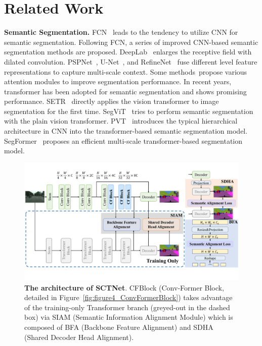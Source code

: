 \documentclass[letterpaper]{article} %
\begin{document}
\section{Related Work}
\textbf{Semantic Segmentation.} 
FCN~\cite{long2015fully} leads to the tendency to utilize CNN for semantic segmentation. Following FCN, a series of improved CNN-based semantic segmentation methods are proposed. DeepLab~\cite{chen2017deeplab} enlarges the receptive field with dilated convolution. PSPNet~\cite{zhao2017pyramid}, U-Net~\cite{ronneberger2015u}, and RefineNet~\cite{lin2017refinenet} fuse different level feature representations to capture multi-scale context. Some methods~\cite{fu2019dual,huang2019ccnet,yuan2018ocnet,zhao2018psanet}propose various attention modules to improve segmentation performance. In recent years, transformer has been adopted for semantic segmentation and shows promising performance. SETR~\cite{zheng2021rethinking} directly applies the vision transformer to image segmentation for the first time. SegViT~\cite{zhang2022segvit} tries to perform semantic segmentation with the plain vision transformer. PVT~\cite{wang2021pyramid} introduces the typical hierarchical architecture in CNN into the transformer-based semantic segmentation model. SegFormer~\cite{xie2021segformer} proposes an efficient multi-scale transformer-based segmentation model.

\begin{figure}
\begin{center}
   \includegraphics[width=\linewidth]{image/figure3_overallarchitecture.pdf}
\end{center}
   \caption{\textbf{The architecture of SCTNet}. CFBlock (Conv-Former Block, detailed in Figure~\ref{fig:figure4_ConvFormerBlock}) takes advantage of the training-only Transformer branch (greyed-out in the dashed box) via SIAM (Semantic Information Alignment Module) which is composed of BFA (Backbone Feature Alignment) and SDHA (Shared Decoder Head Alignment).}
\label{fig:figure3_OverallArchitecture}
\vspace{-10pt}
\end{figure}
\end{document}
